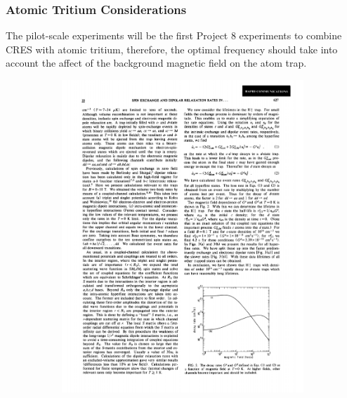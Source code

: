 \subsubsection*{Atomic Tritium Considerations}

The pilot-scale experiments will be the first Project 8 experiments to combine CRES with atomic tritium, therefore, the optimal frequency should take into account the affect of the background magnetic field on the atom trap.
\begin{figure}[htbp]
    \centering
    \begin{subfigure}{0.46\textwidth}
        \includegraphics*[width=\textwidth]{figs/Chapter-3/gloss.pdf}
        \caption{}
    \end{subfigure}
    \hfill
    \begin{subfigure}{0.49\textwidth}

\end{subfigure}
\end{figure}
